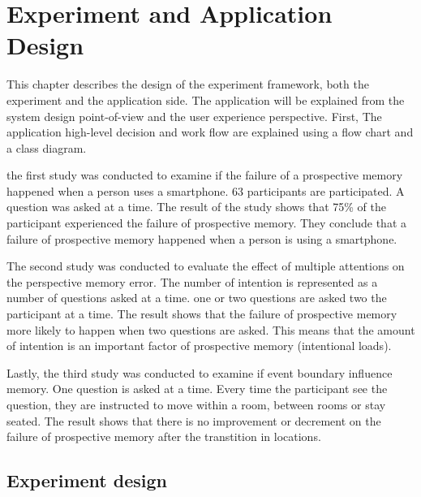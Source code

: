 \chapter{Experiment and Application Design}




This chapter describes the design of the experiment framework, both the experiment and the application side.
The application will be explained from the system design point-of-view and the user experience perspective. First,
The application high-level decision and work flow are explained using a flow chart and a class diagram.


the first study was conducted to examine if the failure of a prospective memory happened when a person uses a smartphone.
63 participants are participated. A question was asked at a time.
The result of the study shows that 75\% of the participant experienced the failure of prospective memory.
They conclude that a failure of prospective memory happened when a person is using a smartphone.


The second study was conducted to evaluate the effect of multiple attentions on the perspective memory error.
The number of intention is represented as a number of questions asked at a time.
one or two questions are asked two the participant at a time.
The result shows that the failure of prospective memory more likely to
happen when two questions are asked. This means that the amount of intention is an important factor of prospective memory (intentional loads).

Lastly, the third study was conducted to examine if event boundary influence memory. One question is asked at a time.
Every time the participant see the question, they are instructed to move within a room, between rooms or stay seated.
The result shows that there is no improvement or decrement on the failure of prospective memory after the transtition in locations.


\section{Experiment design}
